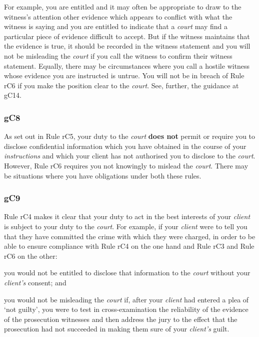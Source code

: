 For example, you are entitled and it may often be appropriate to draw to
the witness's attention other evidence which appears to conflict with
what the witness is saying and you are entitled to indicate that a
\emph{court} may find a particular piece of evidence difficult to
accept. But if the witness maintains that the evidence is true, it
should be recorded in the witness statement and you will not be
misleading the \emph{court} if you call the witness to confirm their
witness statement. Equally, there may be circumstances where you call a
hostile witness whose evidence you are instructed is untrue. You will
not be in breach of Rule rC6 if you make the position clear to the
\emph{court}. See, further, the guidance at gC14.

\subsubsection{\color{darkgrey}gC8}

As set out in Rule rC5, your duty to the \emph{court} \textcolor{myred}{\textbf{does not}} permit or
require you to disclose confidential information which you have obtained
in the course of your \emph{instructions} and which your client has not
authorised you to disclose to the \emph{court}. However, Rule rC6
requires you not knowingly to mislead the \emph{court}. There may be
situations where you have obligations under both these rules.

\subsubsection{\color{darkgrey}gC9}

Rule rC4 makes it clear that your duty to act in the best interests of
your \emph{client} is subject to your duty to the \emph{court}. For
example, if your \emph{client} were to tell you that they have committed
the crime with which they were charged, in order to be able to ensure
compliance with Rule rC4 on the one hand and Rule rC3 and Rule rC6 on
the other:
\begin{numlist}\item you would not be entitled to disclose that information to the
\emph{court} without your \emph{client's} consent; and
\item you would not be misleading the \emph{court} if, after your
\emph{client} had entered a plea of `not guilty', you were to test in
cross-examination the reliability of the evidence of the prosecution
witnesses and then address the jury to the effect that the prosecution
had not succeeded in making them sure of your \emph{client's} guilt.
\end{numlist}

